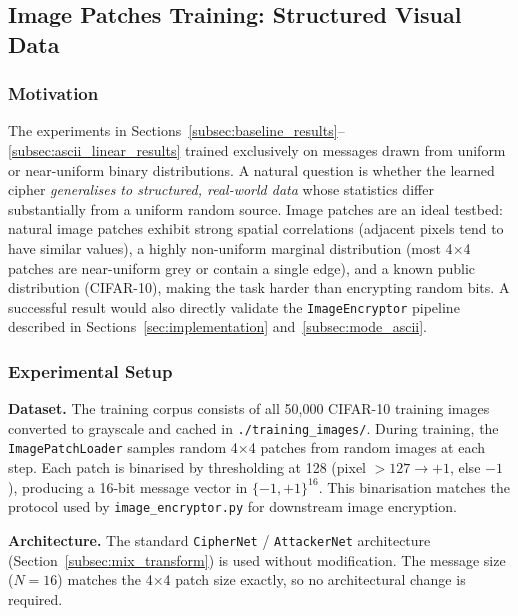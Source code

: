\documentclass[12pt, a4paper]{article}
\newcommand{\code}[1]{\texttt{\color{CodeRed}#1}}
\begin{document}
\subsection{Image Patches Training: Structured Visual Data}
\label{subsec:image_patches_results}

\subsubsection*{Motivation}

The experiments in Sections~\ref{subsec:baseline_results}--\ref{subsec:ascii_linear_results}
trained exclusively on messages drawn from uniform or near-uniform binary distributions.
A natural question is whether the learned cipher \emph{generalises to structured,
	real-world data} whose statistics differ substantially from a uniform random source.
Image patches are an ideal testbed: natural image patches exhibit strong spatial
correlations (adjacent pixels tend to have similar values), a highly non-uniform
marginal distribution (most 4$\times$4 patches are near-uniform grey or contain a
single edge), and a known public distribution (CIFAR-10), making the task
harder than encrypting random bits. A successful result would also directly
validate the \code{ImageEncryptor} pipeline described in
Sections~\ref{sec:implementation} and~\ref{subsec:mode_ascii}.


\subsubsection*{Experimental Setup}

\textbf{Dataset.}
The training corpus consists of all 50{,}000 CIFAR-10 training images converted
to grayscale and cached in \code{./training\_images/}. During training, the
\code{ImagePatchLoader} samples random 4$\times$4 patches from random images
at each step. Each patch is binarised by thresholding at 128 (pixel $> 127
\to +1$, else $-1$), producing a 16-bit message vector in $\{-1,+1\}^{16}$.
This binarisation matches the protocol used by \code{image\_encryptor.py}
for downstream image encryption.

\textbf{Architecture.}
The standard \code{CipherNet} / \code{AttackerNet} architecture
(Section~\ref{subsec:mix_transform}) is used without modification.
The message size ($N = 16$) matches the 4$\times$4 patch size exactly,
so no architectural change is required.
\end{document}
